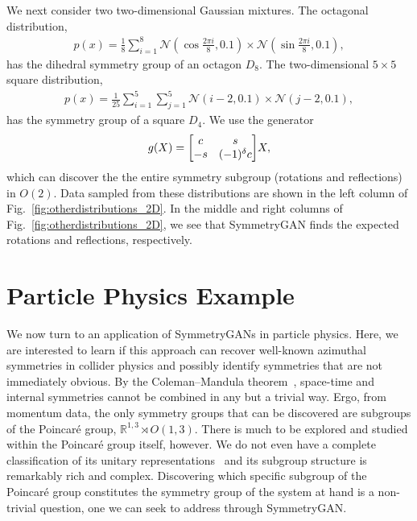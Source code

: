 \documentclass[aps,prx,reprint,preprintnumbers,superscriptaddress,nofootinbib,longbibliography,floatfix]{revtex4-1}
\newcommand{\R}{\mathbb{R}}
\DeclareRobustCommand{\Fig}[1]{Fig.~\ref{fig:#1}}
\begin{document}
We next consider two two-dimensional Gaussian mixtures.
%
The octagonal distribution,
%
\begin{align}
p(x) = \frac18\sum_{i = 1}^8\mathcal N\left(\cos\frac{2\pi i}{8}, 0.1\right)\times \mathcal N\left(\sin\frac{2\pi i}{8}, 0.1\right),
\end{align}
%
has the dihedral symmetry group of an octagon $D_{8}$.
%
The two-dimensional $5\times 5$ square distribution,
%
\begin{align}
p(x) = \frac1{25} \sum_{i = 1}^5\sum_{j = 1}^5\mathcal N (i - 2 , 0.1)\times\mathcal N (j-2, 0.1),
\end{align}
%
has the symmetry group of a square $D_4$.
%
We use the generator \begin{equation}
    \label{eq:O2}
    g(X) = \mqty[c&s\\-s&(-1)^\delta c]X,
\end{equation}
%
which can discover the the entire symmetry subgroup (rotations and reflections) in $O(2)$.
%
Data sampled from these distributions are shown in the left column of \Fig{otherdistributions_2D}.
%
In the middle and right columns of \Fig{otherdistributions_2D}, we see that SymmetryGAN finds the expected rotations and reflections, respectively.


\section{Particle Physics Example}
\label{sec:hepexample}

We now turn to an application of SymmetryGANs in particle physics.
%
Here, we are interested to learn if this approach can recover well-known azimuthal symmetries in collider physics and possibly identify symmetries that are not immediately obvious.
%
By the Coleman--Mandula theorem~\cite{PhysRev.159.1251}, space-time and internal symmetries cannot be combined in any but a trivial way.
%
Ergo, from momentum data, the only symmetry groups that can be discovered are subgroups of the Poincar\'e group, $\R^{1, 3}\rtimes O(1, 3)$.
%
There is much to be explored and studied within the Poincar\'e group itself, however.
%
We do not even have a complete classification of its unitary representations~\cite{doi:10.1142/0537, 10.2307/1968551} and its subgroup structure is remarkably rich and complex.
%
Discovering which specific subgroup of the Poincar\'e group constitutes the symmetry group of the system at hand is a non-trivial question, one we can seek to address through SymmetryGAN.
\end{document}

